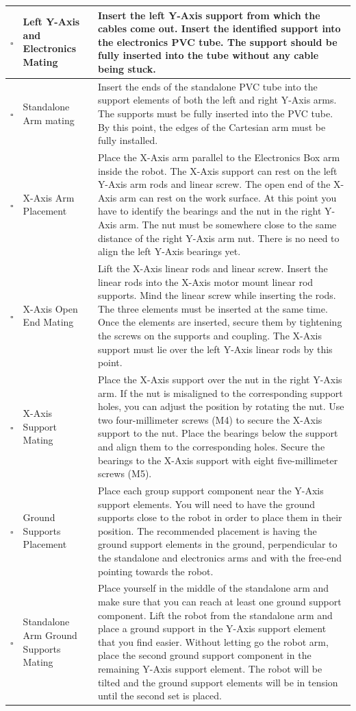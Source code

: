 \documentclass{article}
\begin{document}
\begin{onehalfspacing}
\begin{xltabular}{\textwidth}{|c|p{4cm}|X|}
    $\square$ & Left Y-Axis and Electronics Mating & Insert the left Y-Axis support from which the cables come out. Insert the identified support into the electronics PVC tube. The support should be fully inserted into the tube without any cable being stuck. \\ \hline
    $\square$ & Standalone Arm mating & Insert the ends of the standalone PVC tube into the support elements of both the left and right Y-Axis arms. The supports must be fully inserted into the PVC tube. By this point, the edges of the Cartesian arm must be fully installed. \\ \hline
    $\square$ & X-Axis Arm Placement & Place the X-Axis arm parallel to the Electronics Box arm inside the robot. The X-Axis support can rest on the left Y-Axis arm rods and linear screw. The open end of the X-Axis arm can rest on the work surface. At this point you have to identify the bearings and the nut in the right Y-Axis arm. The nut must be somewhere close to the same distance of the right Y-Axis arm nut. There is no need to align the left Y-Axis bearings yet. \\ \hline
    $\square$ & X-Axis Open End Mating & Lift the X-Axis linear rods and linear screw. Insert the linear rods into the X-Axis motor mount linear rod supports. Mind the linear screw while inserting the rods. The three elements must be inserted at the same time. Once the elements are inserted, secure them by tightening the screws on the supports and coupling. The X-Axis support must lie over the left Y-Axis linear rods by this point.  \\ \hline
    $\square$ & X-Axis Support Mating & Place the X-Axis support over the nut in the right Y-Axis arm. If the nut is misaligned to the corresponding support holes, you can adjust the position by rotating the nut. Use two four-millimeter screws (M4) to secure the X-Axis support to the nut. Place the bearings below the support and align them to the corresponding holes. Secure the bearings to the X-Axis support with eight five-millimeter screws (M5). \\ \hline
    $\square$ & Ground Supports Placement & Place each group support component near the Y-Axis support elements. You will need to have the ground supports close to the robot in order to place them in their position. The recommended placement is having the ground support elements in the ground, perpendicular to the standalone and electronics arms and with the free-end pointing towards the robot. \\ \hline
    $\square$ & Standalone Arm Ground Supports Mating & Place yourself in the middle of the standalone arm and make sure that you can reach at least one ground support component. Lift the robot from the standalone arm and place a ground support in the Y-Axis support element that you find easier. Without letting go the robot arm, place the second ground support component in the remaining Y-Axis support element. The robot will be tilted and the ground support elements will be in tension until the second set is placed. \\ \hline

\end{xltabular}
\end{onehalfspacing}
\end{document}
